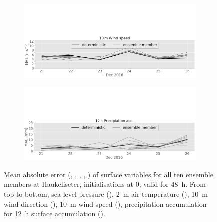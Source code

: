 \begin{figure}[H]
\begin{subfigure}[b]{\textwidth}
		\caption{}\label{fig:MAE:wd}
	\end{subfigure}
	\centering
	\begin{subfigure}[b]{\textwidth}
		\includegraphics[trim={0cm 0cm 0cm 9.5cm},clip,width=\textwidth]{./fig_sfc_ws/MAE_20161220_26_00}
		\caption{}\label{fig:MAE:ws}
	\end{subfigure}
	\begin{subfigure}[b]{\textwidth}
		\includegraphics[trim={0cm 0cm 0cm 9.5cm},clip,width=\textwidth]{./fig_sfc_precip/MAE_20161220_26_00}
		\caption{}\label{fig:MAE:precip12}
	\end{subfigure}
	\caption{Mean absolute error (\protect{}, \protect{}, \protect{}, \protect{}, \protect{}) of surface variables for all ten ensemble members at Haukeliseter, initialisations at \SI{0}{\UTC}, valid for \SI{48}{\hour}. From top to bottom, sea level pressure (\protect{}), \SI{2}{\metre} air temperature (\protect{}), \SI{10}{\metre} wind direction (\protect{}), \SI{10}{\metre} wind speed (\protect{}), precipitation accumulation for \SI{12}{\hour} surface accumulation (\protect{}).}\label{fig:MAE}
\end{figure}
